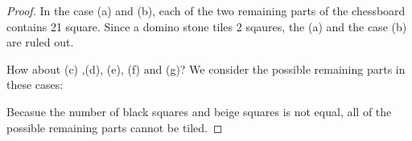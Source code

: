 \documentclass[12pt,a4]{article}
\theoremstyle{exercise}
\begin{document}
\begin{proof}
    In the case (a) and (b), each of the two remaining parts of the chessboard contains 21 square.
    Since a domino stone tiles 2 sqaures, the  (a) and the case (b) are ruled out.

    How about (c) ,(d), (e), (f) and (g)? We consider the possible remaining parts in these cases:

    \begin{figure}[H]
        \centering
	\label{fig:leftPart}
    \end{figure}

    Becasue the number of black squares and beige squares is not equal, all of the possible remaining parts cannot be tiled.

\end{proof}
\end{document}
